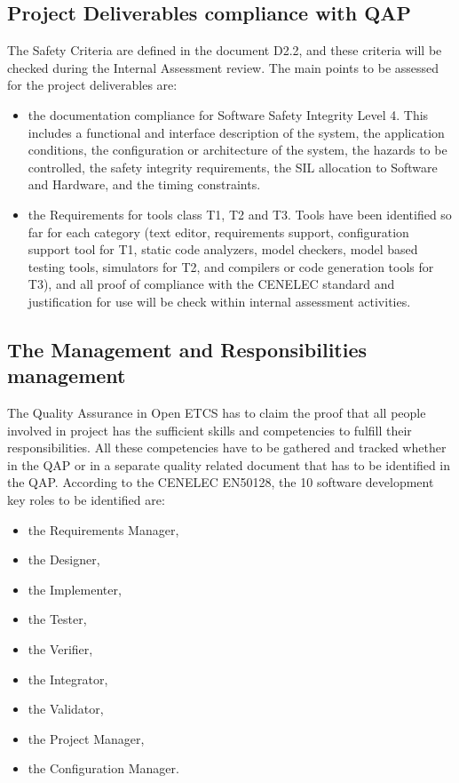 \documentclass{template/openetcs_article}
\begin{document}
\subsection{Project Deliverables compliance with QAP}
The Safety Criteria are defined in the document D2.2, and these criteria will be checked during the Internal Assessment review. The main points to be assessed for the project deliverables are:
\begin{itemize}
\item the documentation compliance for Software Safety Integrity Level 4. This includes a functional and interface description of the system, the application conditions, the configuration or architecture of the system, the hazards to be controlled, the safety integrity requirements, the SIL allocation to Software and Hardware, and the timing constraints.
\item the Requirements for tools class T1, T2 and T3. Tools have been identified so far for each category (text editor, requirements support, configuration support tool for T1,  static code analyzers, model checkers, model based testing tools, simulators for T2, and compilers or code generation tools for T3), and all proof of compliance with the CENELEC standard and justification for use will be check within internal assessment activities.
\end{itemize}

\subsection{The Management and Responsibilities management}
The Quality Assurance in Open ETCS has to claim the proof that all people involved in project has the sufficient skills and competencies to fulfill their responsibilities. All these competencies have to be gathered and tracked whether in the QAP or in a separate quality related document that has to be identified in the QAP.
According to the CENELEC EN50128, the 10 software development key roles to be identified are:
\begin{itemize}
\item the Requirements Manager,
\item the Designer,
\item the Implementer,
\item the Tester,
\item the Verifier,
\item the Integrator,
\item the Validator,
\item the Project Manager,
\item the Configuration Manager.
\end{itemize}
\end{document}
